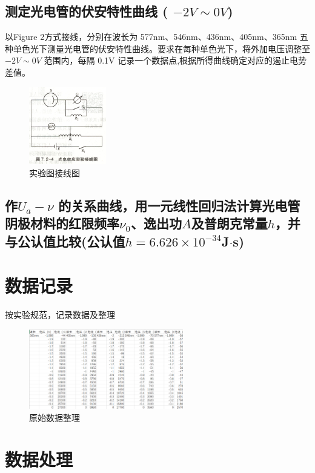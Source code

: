 \documentclass[12pt,a4paper]{article}
\begin{document}
	\subsection{测定光电管的伏安特性曲线 ( \(-2V \sim 0V\))}
	
	以Figure 2方式接线，分别在波长为 577nm、546nm、436nm、405nm、365nm 五种单色光下测量光电管的伏安特性曲线。要求在每种单色光下，将外加电压调整至 \(-2V \sim 0V\) 范围内，每隔 0.1V 记录一个数据点,根据所得曲线确定对应的遏止电势差值。

	\begin{figure}[htbp]
		\centering
		\includegraphics[width=0.3\textwidth]{接线图.png}
		\caption{实验图接线图}
		\label{fig:chart1}
	\end{figure}

	\subsection{作$U_a-\nu$ 的关系曲线，用一元线性回归法计算光电管阴极材料的红限频率$\nu_0$、逸出功$A$及普朗克常量$h$，并与公认值比较(公认值$h=6.626\times$$10^{-34}$J$\cdot$s)}

	\section{数据记录}
	按实验规范，记录数据及整理
	\begin{figure}[H]
		\centering
		\includegraphics[width=0.6\textwidth]{实验数据汇总.png}
		\caption{原始数据整理}
		\label{fig:chart1}
	\end{figure}

	\section{数据处理}
\end{document}
